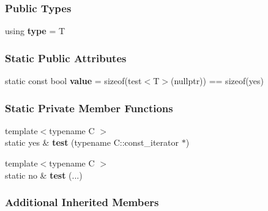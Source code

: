 \subsubsection*{Public Types}
\begin{DoxyCompactItemize}
\item 
using {\bfseries type} = T\hypertarget{structpretty__print_1_1detail_1_1has__const__iterator_acd3b4278d6fc9c967ad3e0f43fa10255}{}\label{structpretty__print_1_1detail_1_1has__const__iterator_acd3b4278d6fc9c967ad3e0f43fa10255}

\end{DoxyCompactItemize}
\subsubsection*{Static Public Attributes}
\begin{DoxyCompactItemize}
\item 
static const bool {\bfseries value} = sizeof(test$<$T$>$(nullptr)) == sizeof(yes)\hypertarget{structpretty__print_1_1detail_1_1has__const__iterator_ad4ebf10f1695835c6a37ec7acbe34b99}{}\label{structpretty__print_1_1detail_1_1has__const__iterator_ad4ebf10f1695835c6a37ec7acbe34b99}

\end{DoxyCompactItemize}
\subsubsection*{Static Private Member Functions}
\begin{DoxyCompactItemize}
\item 
{\footnotesize template$<$typename C $>$ }\\static yes \& {\bfseries test} (typename C\+::const\+\_\+iterator $\ast$)\hypertarget{structpretty__print_1_1detail_1_1has__const__iterator_ac78d015a318214284e13a76ed78cd0ee}{}\label{structpretty__print_1_1detail_1_1has__const__iterator_ac78d015a318214284e13a76ed78cd0ee}

\item 
{\footnotesize template$<$typename C $>$ }\\static no \& {\bfseries test} (...)\hypertarget{structpretty__print_1_1detail_1_1has__const__iterator_a9307138b6341a62e1251246073b5db27}{}\label{structpretty__print_1_1detail_1_1has__const__iterator_a9307138b6341a62e1251246073b5db27}

\end{DoxyCompactItemize}
\subsubsection*{Additional Inherited Members}


